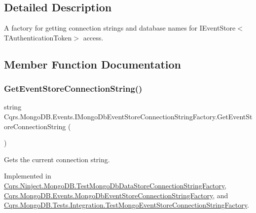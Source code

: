 \subsection{Detailed Description}
A factory for getting connection strings and database names for I\+Event\+Store$<$\+T\+Authentication\+Token$>$ access. 



\subsection{Member Function Documentation}
\mbox{\label{interfaceCqrs_1_1MongoDB_1_1Events_1_1IMongoDbEventStoreConnectionStringFactory_a3860ea4bf6793b081f03fb7cc1dcbb27_a3860ea4bf6793b081f03fb7cc1dcbb27}} 
\subsubsection{\texorpdfstring{Get\+Event\+Store\+Connection\+String()}{GetEventStoreConnectionString()}}
{\footnotesize\ttfamily string Cqrs.\+Mongo\+D\+B.\+Events.\+I\+Mongo\+Db\+Event\+Store\+Connection\+String\+Factory.\+Get\+Event\+Store\+Connection\+String (\begin{DoxyParamCaption}{ }\end{DoxyParamCaption})}



Gets the current connection string. 



Implemented in \hyperlink{classCqrs_1_1Ninject_1_1MongoDB_1_1TestMongoDbDataStoreConnectionStringFactory_a3dcdc2262f3a39be8fdba16a6d09c523_a3dcdc2262f3a39be8fdba16a6d09c523}{Cqrs.\+Ninject.\+Mongo\+D\+B.\+Test\+Mongo\+Db\+Data\+Store\+Connection\+String\+Factory}, \hyperlink{classCqrs_1_1MongoDB_1_1Events_1_1MongoDbEventStoreConnectionStringFactory_af78f60c035678185ecd266019f42838b_af78f60c035678185ecd266019f42838b}{Cqrs.\+Mongo\+D\+B.\+Events.\+Mongo\+Db\+Event\+Store\+Connection\+String\+Factory}, and \hyperlink{classCqrs_1_1MongoDB_1_1Tests_1_1Integration_1_1TestMongoEventStoreConnectionStringFactory_a73b68d1160bae4e92bed4445303d6a8f_a73b68d1160bae4e92bed4445303d6a8f}{Cqrs.\+Mongo\+D\+B.\+Tests.\+Integration.\+Test\+Mongo\+Event\+Store\+Connection\+String\+Factory}.

